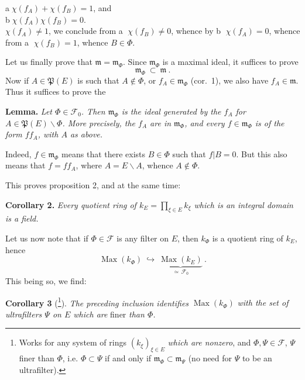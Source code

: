 
\noindent\hspace*{1em}\textcircled{a}\quad $\chi(f_A)+\chi(f_B)=1$, and\\
\hspace*{1em}\textcircled{b}\quad $\chi(f_A)\chi(f_B)=0$.\\
$\chi(f_A)\neq 1$, we conclude from \textcircled{a} $\chi(f_B)\neq 0$, whence by \textcircled{b} $\chi(f_A)=0$, whence from \textcircled{a} $\chi(f_B)=1$, whence $B\in\Phi$.

Let us finally prove that $\mathfrak{m}=\mathfrak{m}_\Phi$. Since $\mathfrak{m}_\Phi$ is a maximal ideal, it suffices to prove
\[
\mathfrak{m}_\Phi\ \subset\ \mathfrak{m}\ .
\]
Now if $A\in\mathfrak{P}(E)$ is such that $A\notin\Phi$, or $f_A\in\mathfrak{m}_\Phi$ (cor.~1), we also have $f_A\in\mathfrak{m}$. Thus it suffices to prove the

\textbf{Lemma.} \textit{Let $\Phi\in\mathcal{F}_0$. Then $\mathfrak{m}_\Phi$ is the ideal generated by the $f_A$ for $A\in\mathfrak{P}(E)\backslash\Phi$. More precisely, the $f_A$ are in $\mathfrak{m}_\Phi$, and every $f\in\mathfrak{m}_\Phi$ is of the form $ff_A$, with $A$ as above.}

Indeed, $f\in\mathfrak{m}_\Phi$ means that there exists $B\in\Phi$ such that $f|B=0$. But this also means that $f=ff_A$, where $A=E\backslash A$, whence $A\notin\Phi$.

This proves proposition 2, and at the same time:

\textbf{Corollary 2.} \textit{Every quotient ring of $k_E=\prod_{\xi\in E}k_\xi$ which is an integral domain is a field.}

Let us now note that if $\Phi\in\mathcal{F}$ is any filter on $E$, then $k_\Phi$ is a quotient ring of $k_E$, hence
\[
\operatorname{Max}(k_\Phi)\ \hookrightarrow\ \underbrace{\operatorname{Max}(k_E)}_{\simeq\,\mathcal{F}_0}\ . \tag*{$(*)$}
\]
This being so, we find:

\textbf{Corollary 3} (\footnote[206]{Works for any system of rings $(k_\xi)_{\xi\in E}$ \textit{which are nonzero}, and $\Phi,\Psi\in\mathcal{F}$, $\Psi$ finer than $\Phi$, i.e. $\Phi\subset\Psi$ if and only if $\mathfrak{m}_\Phi\subset\mathfrak{m}_\Psi$ (no need for $\Psi$ to be an ultrafilter).}). \textit{The preceding inclusion identifies} $\operatorname{Max}(k_\Phi)$ \textit{with the set of ultrafilters $\Psi$ on $E$ which are} finer \textit{than $\Phi$.}

